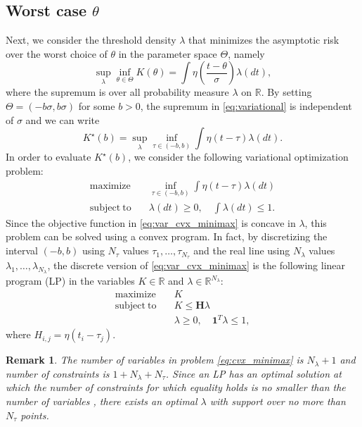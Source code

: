 \documentclass[letterpaper, conference]{IEEEtran}      %
\newtheorem{rem}{\bf {Remark}}
\begin{document}
\subsection{Worst case $\theta$}
Next, we consider the threshold density $\lambda$ that minimizes the asymptotic risk over the worst choice of $\theta$ in the parameter space $\Theta$, namely
\begin{equation} \label{eq:variational}
\sup_{\lambda} \inf_{\theta \in \Theta}  {K(\theta)} = \int \eta\left( \frac{t-\theta}{\sigma} \right) \lambda (dt),
\end{equation}
where the supremum is over all probability measure $\lambda$ on $\mathbb R$. By setting $\Theta = (-b \sigma, b \sigma)$ for some $b >0$, the supremum in \eqref{eq:variational} is independent of $\sigma$ and we can write
\begin{equation} \label{eq:variational2}
K^\star(b) = \sup_{\lambda} \inf_{\tau \in (-b,b)}  \int \eta\left( t-\tau \right) \lambda (dt).
\end{equation}
In order to evaluate $K^\star(b)$, we consider the following variational optimization problem:
\begin{align}
\label{eq:var_cvx_minimax}
\mathrm{maximize} \quad &  \inf_{\tau \in (-b,b)} \int \eta(t-\tau) \lambda(dt)
\\ \nonumber
\mathrm{subject~to} 
\quad & \lambda(dt)\geq 0,\quad \int \lambda(dt) \leq 1. 
\end{align}
Since the objective function in \eqref{eq:var_cvx_minimax} is concave in $\lambda$, this problem can be solved using a convex program. In fact, by discretizing the interval $(-b,b)$ using $N_\tau$ values $\tau_1,\ldots,\tau_{N_\tau}$ and the real line using $N_\lambda$ values $\lambda_1,\ldots,\lambda_{N_\lambda}$, the discrete version of \eqref{eq:var_cvx_minimax} is the following linear program (LP) in the variables $K \in \mathbb R$ and $\lambda \in \mathbb R^{N_\lambda}$:
\begin{align}
\label{eq:cvx_minimax}
\mathrm{maximize} \quad &  K 
\\ \nonumber
\mathrm{subject~to} 
\quad &  K \leq \mathbf H\lambda \\
& \lambda \geq 0,\quad   \mathbf 1^T\lambda  \leq 1,
\end{align}
where $H_{i,j} = \eta(t_i - \tau_j)$. 
\begin{rem}
The number of variables in problem \eqref{eq:cvx_minimax} is $N_\lambda+1$ and number of constraints is $1 + N_\lambda + N_\tau$. Since an LP has an optimal solution at which the number of constraints for which equality holds is no smaller than the number of variables \cite{papadimitriou1998combinatorial}, there exists an optimal $\lambda$ with support over no more than $N_{\tau}$ points. 
\end{rem} 
\end{document}
